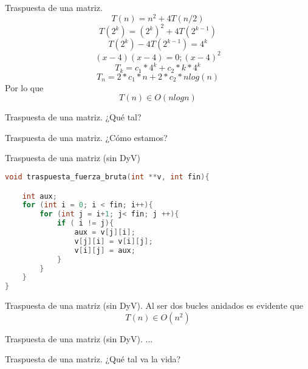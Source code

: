 \documentclass[10pt, xcolor=table]{beamer}
\begin{document}
\begin{frame}[fragile]{Traspuesta de una matriz. }
$$T(n) = n^2 +4T(n/2)$$
$$T(2^k) = (2^k)^2+4T(2^{k-1})$$
$$T(2^k)-4T(2^{k-1}) = 4^k$$
$$(x-4)(x-4) = 0; (x-4)^2$$
$$T_k = c_1*4^k+c_2*k*4^k$$
$$T_n = 2*c_1*n + 2*c_2*nlog(n)$$
Por lo que $$T(n) \in O(nlogn)$$
\end{frame}

\begin{frame}[fragile]{Traspuesta de una matriz. }
¿Qué tal?
\end{frame}

\begin{frame}[fragile]{Traspuesta de una matriz. }
¿Cómo estamos?
\end{frame}

\begin{frame}[fragile]{Traspuesta de una matriz (sin DyV)}
\begin{lstlisting}[language=C]
void traspuesta_fuerza_bruta(int **v, int fin){

	int aux;
	for (int i = 0; i < fin; i++){
		for (int j = i+1; j< fin; j ++){
			if ( i != j){
				aux = v[j][i];
				v[j][i] = v[i][j];
				v[i][j] = aux;
			}
		}
	}
}

\end{lstlisting}
\end{frame}

\begin{frame}[fragile]{Traspuesta de una matriz (sin DyV). }
Al ser dos bucles anidados es evidente que $$T(n) \in O(n^2)$$

\end{frame}

\begin{frame}[fragile]{Traspuesta de una matriz (sin DyV). }
...
\end{frame}

\begin{frame}[fragile]{Traspuesta de una matriz. }
¿Qué tal va la vida?
\end{frame}
\end{document}
